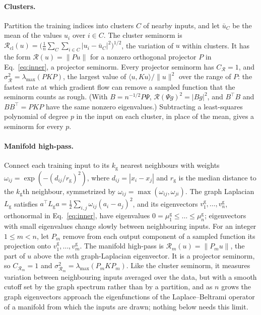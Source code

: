 \documentclass[11pt]{article}
\theoremstyle{definition}
\theoremstyle{remark}
\newcommand{\Rgh}{\mathcal{R}}           %
\newcommand{\sR}{\sigma_{\Rgh}}
\newcommand{\CR}{C_{\Rgh}}
\newcommand{\ip}[2]{\langle #1,#2\rangle}
\begin{document}
\paragraph{Clusters.}
Partition the training indices into clusters $C$ of nearby inputs, and let $\bar u_C$ be the mean of the values $u_i$ over $i \in C$.
The cluster seminorm is $\Rgh_{\mathrm{cl}}(u) = \big(\tfrac1n\sum_C\sum_{i\in C}|u_i - \bar u_C|^2\big)^{1/2}$, the variation of $u$ within clusters.
It has the form $\Rgh(u) = \|Pu\|$ for a nonzero orthogonal projector $P$ in Eq.~\eqref{eq:inner}, a projector seminorm.
Every projector seminorm has $\CR = 1$, and $\sR^2 = \lambda_{\max}(PKP)$, the largest value of $\ip{u}{Ku}/\|u\|^2$ over the range of $P$: the fastest rate at which gradient flow can remove a sampled function that the seminorm counts as rough.
(With $B = n^{-1/2}P\Psi$, $\Rgh(\Psi g)^2 = |Bg|^2$, and $B^\top B$ and $BB^\top = PKP$ have the same nonzero eigenvalues.)
Subtracting a least-squares polynomial of degree $p$ in the input on each cluster, in place of the mean, gives a seminorm for every $p$.

\paragraph{Manifold high-pass.}
Connect each training input to its $k_{\mathrm g}$ nearest neighbours with weights $\omega_{ij} = \exp(-(d_{ij}/r_{\mathrm g})^2)$, where $d_{ij} = |x_i - x_j|$ and $r_{\mathrm g}$ is the median distance to the $k_{\mathrm g}$th neighbour, symmetrized by $\omega_{ij} = \max(\omega_{ij},\omega_{ji})$.
The graph Laplacian $L_{\mathrm g}$ satisfies $a^\top L_{\mathrm g}a = \tfrac12\sum_{i,j}\omega_{ij}(a_i - a_j)^2$, and its eigenvectors $v^{\mathrm g}_1,\dots,v^{\mathrm g}_n$, orthonormal in Eq.~\eqref{eq:inner}, have eigenvalues $0 = \mu^{\mathrm g}_1 \le \dots \le \mu^{\mathrm g}_n$; eigenvectors with small eigenvalues change slowly between neighbouring inputs.
For an integer $1 \le m < n$, let $P_m$ remove from each output component of a sampled function its projection onto $v^{\mathrm g}_1,\dots,v^{\mathrm g}_m$.
The manifold high-pass is $\Rgh_m(u) = \|P_m u\|$, the part of $u$ above the $m$th graph-Laplacian eigenvector.
It is a projector seminorm, so $C_{\Rgh_m} = 1$ and $\sigma_{\Rgh_m}^2 = \lambda_{\max}(P_mKP_m)$.
Like the cluster seminorm, it measures variation between neighbouring inputs averaged over the data, but with a smooth cutoff set by the graph spectrum rather than by a partition, and as $n$ grows the graph eigenvectors approach the eigenfunctions of the Laplace--Beltrami operator of a manifold from which the inputs are drawn; nothing below needs this limit.
\end{document}
